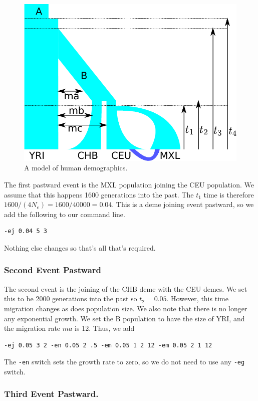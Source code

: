 \documentclass{article}
\begin{document}
\begin{figure}
\begin{center}
	\includegraphics[width=.7\textwidth]{popModelLabel} 
\end{center}
\caption{A model of human demographics.}\label{fig:hard}
\end{figure}

The first pastward event is the MXL population joining the CEU population. We
assume that this happens 1600 generations into the past. The $t_1$ time is
therefore $1600/(4N_e)=1600/40000=0.04$. This is a deme joining event pastward,
so we add the following to our command line.
\begin{verbatim}
-ej 0.04 5 3
\end{verbatim}
Nothing else changes so that's all that's required. 

\subsubsection*{Second Event Pastward}

The second event is the joining of the CHB deme with the CEU demes. We set this
to be 2000 generations into the past so $t_2=0.05$. However, this time migration
changes as does population size. We also note that there is no longer any
exponential growth. We set the B population to  have the size of YRI, and 
the migration rate $ma$ is 12. Thus, we add
\begin{verbatim}
-ej 0.05 3 2 -en 0.05 2 .5 -em 0.05 1 2 12 -em 0.05 2 1 12 
\end{verbatim}
The {\tt -en} switch sets the growth rate to zero, so we do not need to use any
{\tt -eg} switch. 

\subsubsection*{Third Event Pastward.}
\end{document}
